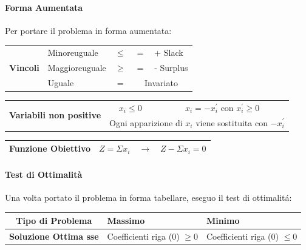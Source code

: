 \documentclass[12pt, a4paper, openany]{book}
\begin{document}
\paragraph{Forma Aumentata} Per portare il problema in forma aumentata:\\
\begin{tabularx}{\textwidth}{|X|lc|c|l|}
	\hline
	\multirow{3}{*}{\textbf{Vincoli}} & Minoreuguale   & $\leq$ & $ = $                          & + Slack   \\
	\cline{2-5}
	                                  & Maggioreuguale & $\geq$ & $ =$                           & - Surplus \\
	\cline{2-5}
	                                  & Uguale         & $=$    & \multicolumn{2}{c|}{Invariato}             \\
	\hline
\end{tabularx}
\begin{tabularx}{\textwidth}{|X|c|c|}
	\hline
	\multirow{2}{*}{\textbf{Variabili non positive}} & $x_i\leq 0$                                                                     & $ x_i = -x_i^{'} \text{ con } x_i^{'}\geq 0 $ \\
	\cline{2-3}
	                                                 & \multicolumn{2}{|l|}{Ogni apparizione di $x_i$ viene sostituita con $-x_i^{'}$}                                                 \\
	\hline
\end{tabularx}
\begin{tabularx}{\textwidth}{|X|ccc|}
	\hline

	\textbf{Funzione Obiettivo} & $Z = \Sigma x_i $ & $\to$ & $ Z - \Sigma x_i = 0$ \\
	\hline
\end{tabularx}

\paragraph{Test di Ottimalità}
Una volta portato il problema in forma tabellare, eseguo il test di ottimalitá:\\
\begin{tabularx}{\textwidth}{|c|Y|Y|}
	\hline
	Tipo di Problema              & \textbf{ Massimo}                                    & \textbf{Minimo}                \\
	\hline \hline
	\textbf{Soluzione Ottima sse} & Coefficienti riga (0) $\geq 0$                       & Coefficienti riga (0) $\leq 0$ \\
	\hline
\end{tabularx}
\end{document}
